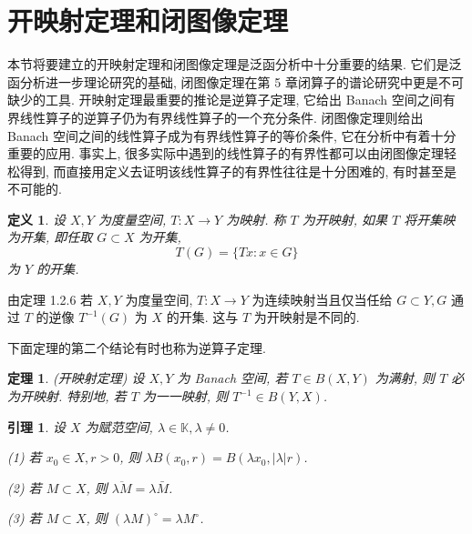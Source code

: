 \documentclass[openany]{ctexbook}
\theoremstyle{kaiti}
\newtheorem{definition}{定义}[section]
\newtheorem{theorem}{定理}[section]
\newtheorem{lemma}{引理}[section]
\theoremstyle{normal}
\begin{document}
\section{开映射定理和闭图像定理}

本节将要建立的开映射定理和闭图像定理是泛函分析中十分重要的结果. 它们是泛函分析进一步理论研究的基础, 闭图像定理在第 5 章闭算子的谱论研究中更是不可缺少的工具. 开映射定理最重要的推论是逆算子定理, 它给出 Banach 空间之间有界线性算子的逆算子仍为有界线性算子的一个充分条件. 闭图像定理则给出 Banach 空间之间的线性算子成为有界线性算子的等价条件, 它在分析中有着十分重要的应用. 事实上, 很多实际中遇到的线性算子的有界性都可以由闭图像定理轻松得到, 而直接用定义去证明该线性算子的有界性往往是十分困难的, 有时甚至是不可能的.

\begin{definition}
设 $X, Y$ 为度量空间, $T: X \rightarrow Y$ 为映射. 称 $T$ 为开映射, 如果 $T$ 将开集映为开集, 即任取 $G \subset X$ 为开集,
$$
T(G)=\{T x: x \in G\}
$$
为 $Y$ 的开集.
\end{definition}

由定理 1.2.6 若 $X, Y$ 为度量空间, $T: X \rightarrow Y$ 为连续映射当且仅当任给 $G \subset Y, G$ 通过 $T$ 的逆像 $T^{-1}(G)$ 为 $X$ 的开集. 这与 $T$ 为开映射是不同的.

下面定理的第二个结论有时也称为逆算子定理.

\begin{theorem}
(开映射定理) 设 $X, Y$ 为 Banach 空间, 若 $T \in B(X, Y)$ 为满射, 则 $T$ 必为开映射. 特别地, 若 $T$ 为一一映射, 则 $T^{-1} \in B(Y, X)$.
\end{theorem}

\begin{lemma}
设 $X$ 为赋范空间, $\lambda \in \mathbb{K}, \lambda \neq 0$.

(1) 若 $x_0 \in X, r>0$, 则 $\lambda B\left(x_0, r\right)=B\left(\lambda x_0,|\lambda| r\right)$.

(2) 若 $M \subset X$, 则 $\overline{\lambda M}=\lambda \bar{M}$.

(3) 若 $M \subset X$, 则 $(\lambda M)^{\circ}=\lambda M^{\circ}$.
\end{lemma}
\end{document}

